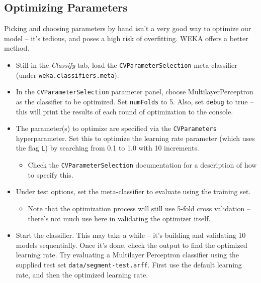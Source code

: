 \documentclass[11pt]{cselabheader}
\begin{document}
\pagebreak
\subsection{Optimizing Parameters}

Picking and choosing parameters by hand isn't a very good way to optimize our model -- it's tedious, and poses a high risk of overfitting. WEKA offers a better method.

\begin{itemize}[leftmargin=*]
  \item Still in the \emph{Classify} tab, load the \texttt{CVParameterSelection} meta-classifier (under \texttt{weka.classifiers.meta}).

  \item In the \texttt{CVParameterSelection} parameter panel, choose MultilayerPerceptron as the classifier to be optimized. Set \texttt{numFolds} to 5. Also, set \texttt{debug} to true -- this will print the results of each round of optimization to the console.

  \item The parameter(s) to optimize are specified via the \texttt{CVParameters} hyperparameter. Set this to optimize the learning rate parameter (which uses the flag \texttt{L}) by searching from 0.1 to 1.0 with 10 increments.
  \begin{itemize}[leftmargin=*]
    \item Check the \texttt{CVParameterSelection} documentation for a description of how to specify this.
  \end{itemize}

  \item Under test options, set the meta-classifier to evaluate using the training set.
  \begin{itemize}[leftmargin=*]
    \item Note that the optimization process will still use 5-fold cross validation -- there's not much use here in validating the optimizer itself.
  \end{itemize}

  \item Start the classifier. This may take a while -- it's building and validating 10 models sequentially. Once it's done, check the output to find the optimized learning rate. Try evaluating a Multilayer Perceptron classifier using the supplied test set \texttt{data/segment-test.arff}. First use the default learning rate, and then the optimized learning rate.


\end{itemize}
\end{document}
